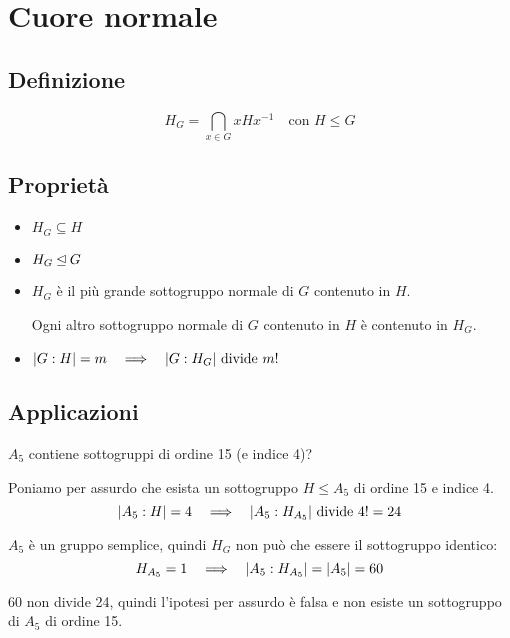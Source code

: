 \chapter{Cuore normale}
\label{ch:cuore_normale}

\section{Definizione}
\label{sec:cuore_normale_definizione}

\begin{equation*}
    H_G = \bigcap_{x \in G} xHx^{-1} \quad \text{con } H \le G
\end{equation*}

\section{Proprietà}
\label{sec:cuore_normale_proprieta}

\begin{itemize}
    \item $H_G \subseteq H$
    \item $H_G \unlhd G$
    \item $H_G$ è il più grande sottogruppo normale di $G$ contenuto in $H$.

        Ogni altro sottogruppo normale di $G$ contenuto in $H$ è contenuto in $H_G$.
    \item $\lvert G:H \rvert = m \quad\Longrightarrow\quad \lvert G:H_G \rvert \text{ divide } m!$
\end{itemize}

\section{Applicazioni}
\label{sec:cuore_normale_applicazioni}

$A_5$ contiene sottogruppi di ordine 15 (e indice 4)?

Poniamo per assurdo che esista un sottogruppo $H \le A_5$ di ordine 15 e indice 4.
\begin{equation*}
    \lvert A_5:H \rvert = 4 \quad\Longrightarrow\quad \lvert A_5:H_{A_5} \rvert \text{ divide } 4! = 24
\end{equation*}

$A_5$ è un gruppo semplice, quindi $H_G$ non può che essere il sottogruppo identico:
\begin{equation*}
    H_{A_5} = 1 \quad\Longrightarrow\quad \lvert A_5:H_{A_5} \rvert = \lvert A_5 \rvert = 60
\end{equation*}

60 non divide 24, quindi l'ipotesi per assurdo è falsa e non esiste un sottogruppo di $A_5$ di ordine 15.



